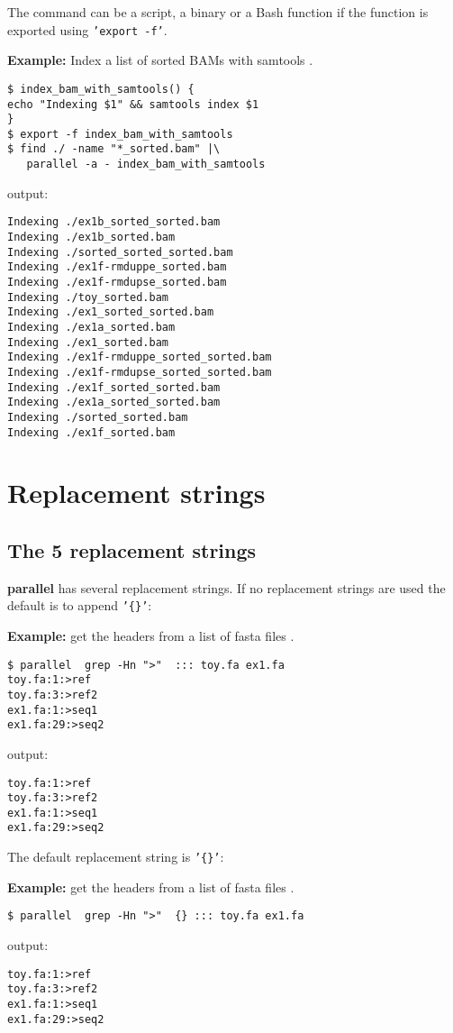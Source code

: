 \documentclass{article}
\newcommand{\example}[1]{
\textbf{Example: } {\color[rgb]{0,0,1} #1 } .
}
\newcommand{\cmdoption}[1]{\texttt{'#1'}}
\def\prl{\textbf{parallel}}
\begin{document}
The command can be a script, a binary or a Bash function if the function is exported using \cmdoption{export -f}.
\example{Index a list of sorted BAMs with samtools}
\begin{lstlisting}
$ index_bam_with_samtools() {
echo "Indexing $1" && samtools index $1
}
$ export -f index_bam_with_samtools
$ find ./ -name "*_sorted.bam" |\
   parallel -a - index_bam_with_samtools
\end{lstlisting}
output:
\begin{lstlisting}
Indexing ./ex1b_sorted_sorted.bam
Indexing ./ex1b_sorted.bam
Indexing ./sorted_sorted_sorted.bam
Indexing ./ex1f-rmduppe_sorted.bam
Indexing ./ex1f-rmdupse_sorted.bam
Indexing ./toy_sorted.bam
Indexing ./ex1_sorted_sorted.bam
Indexing ./ex1a_sorted.bam
Indexing ./ex1_sorted.bam
Indexing ./ex1f-rmduppe_sorted_sorted.bam
Indexing ./ex1f-rmdupse_sorted_sorted.bam
Indexing ./ex1f_sorted_sorted.bam
Indexing ./ex1a_sorted_sorted.bam
Indexing ./sorted_sorted.bam
Indexing ./ex1f_sorted.bam
\end{lstlisting}

\section{Replacement strings}
\subsection{The 5 replacement strings}
\prl{} has several replacement strings. If no replacement strings are used the default is to append \cmdoption{\{\}}:
\example{get the headers from a list of fasta files}
\begin{lstlisting}
$ parallel  grep -Hn ">"  ::: toy.fa ex1.fa
toy.fa:1:>ref
toy.fa:3:>ref2
ex1.fa:1:>seq1
ex1.fa:29:>seq2
\end{lstlisting}
output:
\begin{lstlisting}
toy.fa:1:>ref
toy.fa:3:>ref2
ex1.fa:1:>seq1
ex1.fa:29:>seq2
\end{lstlisting}

The default replacement string is \cmdoption{\{\}}:
\example{get the headers from a list of fasta files}
\begin{lstlisting}
$ parallel  grep -Hn ">"  {} ::: toy.fa ex1.fa
\end{lstlisting}
output:
\begin{lstlisting}
toy.fa:1:>ref
toy.fa:3:>ref2
ex1.fa:1:>seq1
ex1.fa:29:>seq2
\end{lstlisting}
\end{document}
